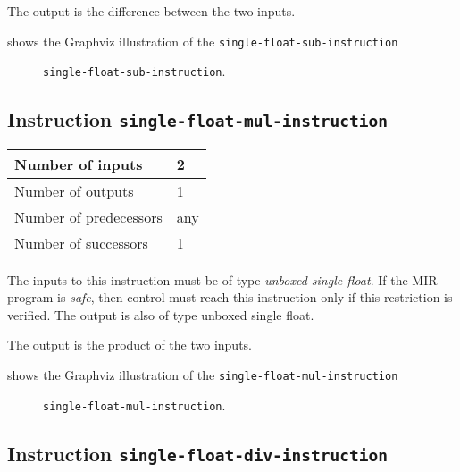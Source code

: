 The output is the difference between the two inputs.

 shows the Graphviz illustration of the
\texttt{single-float-sub-instruction}

\begin{figure}
\begin{center}
\end{center}
\caption{\label{fig-single-float-sub-instruction}
\texttt{single-float-sub-instruction}.}
\end{figure}

\subsection{Instruction \texttt{single-float-mul-instruction}}
\label{mir-instruction-single-float-mul}

\begin{tabular}{|l|l|}
\hline
Number of inputs & 2\\
\hline
Number of outputs & 1\\
\hline
Number of predecessors & any\\
\hline
Number of successors & 1\\
\hline
\end{tabular}

The inputs to this instruction must be of type \emph{unboxed single
  float}.  If the MIR program is \emph{safe}, then control must reach
this instruction only if this restriction is verified.  The output is
also of type unboxed single float.

The output is the product of the two inputs.

 shows the Graphviz illustration of the
\texttt{single-float-mul-instruction}

\begin{figure}
\begin{center}
\end{center}
\caption{\label{fig-single-float-mul-instruction}
\texttt{single-float-mul-instruction}.}
\end{figure}

\subsection{Instruction \texttt{single-float-div-instruction}}
\label{mir-instruction-single-float-div}

